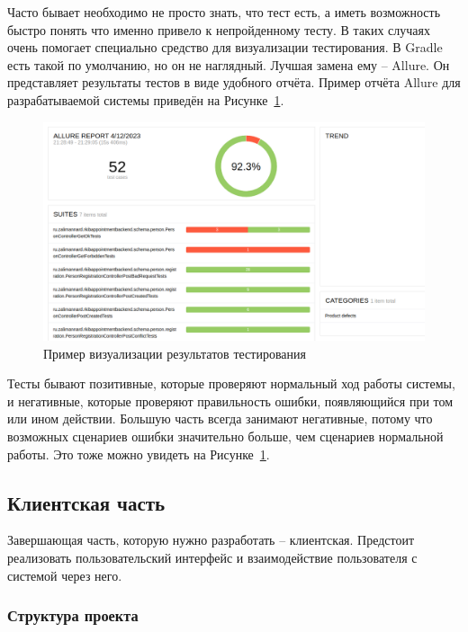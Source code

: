 \documentclass[a4paper,article]{article}
\begin{document}
\begin{sloppypar}
    Часто бывает необходимо не просто знать, что тест есть, а иметь возможность быстро понять что именно привело к непройденному тесту. В таких случаях очень помогает специально средство для визуализации тестирования. В Gradle есть такой по умолчанию, но он не наглядный. Лучшая замена ему -- Allure. Он представляет результаты тестов в виде удобного отчёта. Пример отчёта Allure для разрабатываемой системы приведён на Рисунке~\ref{fig:Allure}.

    \begin{figure}[h]

        \centering

        \includegraphics[width=0.8\linewidth]{Allure.png}

        \caption{\centering Пример визуализации результатов тестирования}

        \label{fig:Allure}

    \end{figure}

    Тесты бывают позитивные, которые проверяют нормальный ход работы системы, и негативные, которые проверяют правильность ошибки, появляющийся при том или ином действии. Большую часть всегда занимают негативные, потому что возможных сценариев ошибки значительно больше, чем сценариев нормальной работы. Это тоже можно увидеть на Рисунке~\ref{fig:Allure}.

    \newpage

    \subsection{Клиентская часть}\label{Реализация. Клиентская часть}

    Завершающая часть, которую нужно разработать -- клиентская. Предстоит реализовать пользовательский интерфейс и взаимодействие пользователя с системой через него.

    \subsubsection{Структура проекта}\label{Реализация. Клиентская часть. Структура проекта}


\end{sloppypar}
\end{document}
